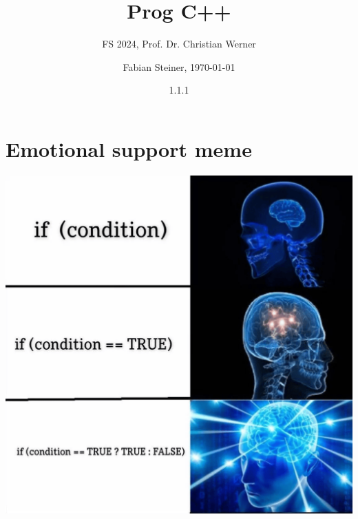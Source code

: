 \documentclass[fontsize=8pt, a4paper, fleqn, landscape, DIV=calc]{scrartcl}
\title{\vspace{-1cm}Prog C++}
\subtitle{FS 2024, Prof. Dr. Christian Werner}
\author{Fabian Steiner, \today}
\date{{\small 1.1.1}}
\begin{document}
	\begin{multicols*}{3}
        \begin{minipage}{0.75\columnwidth}
		      \maketitle
        \end{minipage}
        \begin{minipage}{0.2\columnwidth}
            \begin{center}
                \quad
                \qquad    
            \end{center}
        \end{minipage}
        
        \thispagestyle{fancy}%

        
        
        
        
        
        \section{Emotional support meme}
        
        \begin{center}
            \includegraphics[width=\columnwidth]{pictures/ifcondition.png}  
        \end{center}            

	\end{multicols*}
\end{document}
